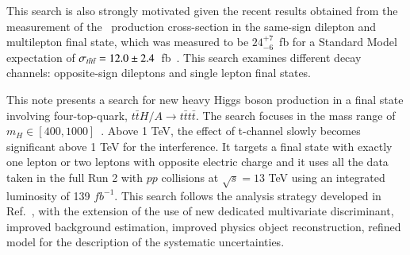 This search is also strongly motivated given the recent results obtained from the measurement of the \tttt~production cross-section in the same-sign dilepton and multilepton final state, which was measured to be $24^{+7}_{-6}$~fb for a Standard Model expectation of  $\sigma_{t\bar{t}t\bar t }=12.0\pm2.4$~fb~\cite{Aad:2020klt}. This search examines different decay channels: opposite-sign dileptons and single lepton final states.   

This note presents a search for new heavy Higgs boson production in a final state involving four-top-quark, $t\bar{t}H/A \to t\bar{t}t\bar{t}$. The search focuses in the mass range of $m_H\in[400,1000]$~\GeV. Above 1 TeV, the effect of t-channel slowly becomes significant above 1 TeV for the interference. It targets a final state with exactly one lepton or two leptons with opposite electric charge and it uses all the data taken  in the full Run 2  with $pp$ collisions at $\sqrt{s} = 13$ TeV using an integrated luminosity of 139 $fb^{-1}$. 
This search follows the analysis strategy developed in Ref.~\cite{Aad:2020klt}, with the extension of the use of new dedicated multivariate discriminant, improved background estimation, 
improved physics object reconstruction, refined model for the description of the systematic uncertainties. 

